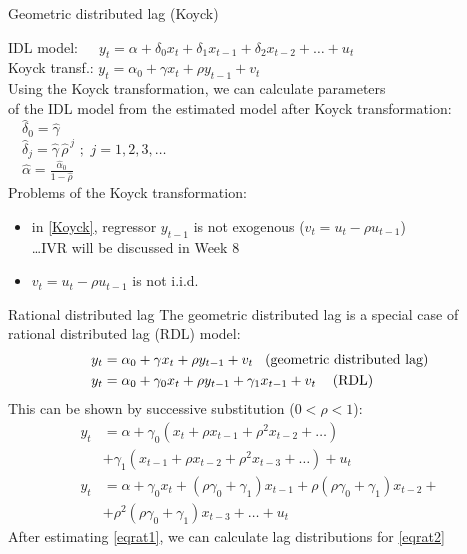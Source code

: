 \documentclass{beamer}
\begin{document}
\begin{frame}{Geometric distributed lag (Koyck) }

IDL model: $\quad \,y_t = \alpha + \delta_0 x_t  + \delta_1 x_{t-1} + \delta_2 x_{t-2} + \dots + u_t $\\
\medskip
Koyck transf.: $y_t = \alpha_0 + \gamma x_t + \rho y_{t-1} + v_t$ \\
\medskip
Using the Koyck transformation, we can calculate parameters \\of the IDL model from the estimated model after Koyck transformation:\\
\medskip
$\quad \hat{\delta}_0 = \hat{\gamma}$ \\
\medskip
$\quad \hat{\delta}_j = \hat{\gamma} \, \hat{\rho}^{\,j} \,\, ; \,\, j = 1,2,3, \dots$ \\
\medskip
$\quad \hat{\alpha} = \frac{\hat{\alpha}_0}{1-\hat{\rho}}$\\
\medskip
Problems of the Koyck transformation:
\begin{itemize}
    \item in \eqref{Koyck}, regressor $y_{t-1}$ is not exogenous ($v_t=u_t-\rho u_{t-1}$)\\ \dots IVR will be discussed in Week 8
    \item $v_t=u_t-\rho u_{t-1}$ is not i.i.d.
\end{itemize}


\end{frame}

\begin{frame}{Rational distributed lag}
The geometric distributed lag is a special case of \\rational distributed lag (RDL) model:
\begin{align} \nonumber
y_t & = \alpha_0+\gamma x_t + \rho y_{t-1} + v_t \hspace{0.3cm} \textnormal{(geometric distributed lag)}\\\label{eqrat1} 
y_t & = \alpha_0+\gamma_0 x_t + \rho y_{t-1} +\gamma_1 x_{t-1} + v_t  \hspace{0.3cm} \textnormal{ (RDL)}
\end{align}
This can be shown by successive substitution ($0 < \rho < 1$):
\begin{align}\nonumber
y_t & = \alpha + \gamma_0 (x_t + \rho x_{t-1} + \rho^2 x_{t-2}+\dots) \\ & + \gamma_1 (x_{t-1} + \rho x_{t-2} + \rho^2 x_{t-3}+\dots) + u_t \\ \nonumber
y_t & = \alpha + \gamma_0 x_t + (\rho \gamma_0 + \gamma_1) x_{t-1} + \rho (\rho \gamma_0 + \gamma_1) x_{t-2} +\\ & + \rho^2 (\rho \gamma_0 + \gamma_1) x_{t-3} + \dots + u_t \label{eqrat2}
\end{align}
After estimating \eqref{eqrat1}, we can calculate lag distributions for \eqref{eqrat2}

\end{frame}
\end{document}

